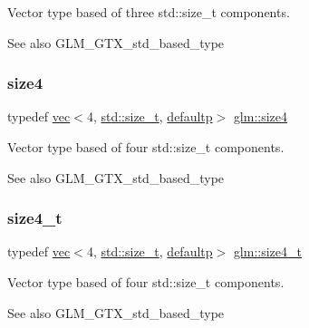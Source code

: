 Vector type based of three std\+::size\+\_\+t components. \begin{DoxySeeAlso}{See also}
G\+L\+M\+\_\+\+G\+T\+X\+\_\+std\+\_\+based\+\_\+type 
\end{DoxySeeAlso}
\mbox{\label{group__gtx__std__based__type_ga6051b5077b52ff8ea48a5207d5076aa5}} 
\subsubsection{\texorpdfstring{size4}{size4}}
{\footnotesize\ttfamily typedef \hyperlink{structglm_1_1vec}{vec}$<$4, \hyperlink{_s_d_l__config__winrt_8h_a7c94ea6f8948649f8d181ae55911eeaf}{std\+::size\+\_\+t}, \hyperlink{namespaceglm_a36ed105b07c7746804d7fdc7cc90ff25a9d21ccd8b5a009ec7eb7677befc3bf51}{defaultp}$>$ \hyperlink{group__gtx__std__based__type_ga6051b5077b52ff8ea48a5207d5076aa5}{glm\+::size4}}

Vector type based of four std\+::size\+\_\+t components. \begin{DoxySeeAlso}{See also}
G\+L\+M\+\_\+\+G\+T\+X\+\_\+std\+\_\+based\+\_\+type 
\end{DoxySeeAlso}
\mbox{\label{group__gtx__std__based__type_ga2bb2915bb83bb9d7a2967fe20aa7d2a5}} 
\subsubsection{\texorpdfstring{size4\+\_\+t}{size4\_t}}
{\footnotesize\ttfamily typedef \hyperlink{structglm_1_1vec}{vec}$<$4, \hyperlink{_s_d_l__config__winrt_8h_a7c94ea6f8948649f8d181ae55911eeaf}{std\+::size\+\_\+t}, \hyperlink{namespaceglm_a36ed105b07c7746804d7fdc7cc90ff25a9d21ccd8b5a009ec7eb7677befc3bf51}{defaultp}$>$ \hyperlink{group__gtx__std__based__type_ga2bb2915bb83bb9d7a2967fe20aa7d2a5}{glm\+::size4\+\_\+t}}

Vector type based of four std\+::size\+\_\+t components. \begin{DoxySeeAlso}{See also}
G\+L\+M\+\_\+\+G\+T\+X\+\_\+std\+\_\+based\+\_\+type 
\end{DoxySeeAlso}
